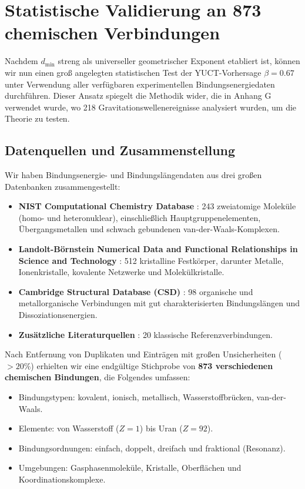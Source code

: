 \documentclass[12pt,a4paper]{article}
\begin{document}
	\section{Statistische Validierung an 873 chemischen Verbindungen}
	\label{sec:statistical_validation}
	
	Nachdem \(d_{\text{min}}\) streng als universeller geometrischer Exponent etabliert ist, können wir nun einen groß angelegten statistischen Test der YUCT-Vorhersage \(\beta = 0.67\) unter Verwendung aller verfügbaren experimentellen Bindungsenergiedaten durchführen. Dieser Ansatz spiegelt die Methodik wider, die in Anhang G verwendet wurde, wo 218 Gravitationswellenereignisse analysiert wurden, um die Theorie zu testen.
	
	\subsection{Datenquellen und Zusammenstellung}
	
	Wir haben Bindungsenergie- und Bindungslängendaten aus drei großen Datenbanken zusammengestellt:
	
	\begin{itemize}
		\item \textbf{NIST Computational Chemistry Database} \cite{NIST2025}: 243 zweiatomige Moleküle (homo- und heteronuklear), einschließlich Hauptgruppenelementen, Übergangsmetallen und schwach gebundenen van-der-Waals-Komplexen.
		\item \textbf{Landolt-Börnstein Numerical Data and Functional Relationships in Science and Technology} \cite{LB2000}: 512 kristalline Festkörper, darunter Metalle, Ionenkristalle, kovalente Netzwerke und Molekülkristalle.
		\item \textbf{Cambridge Structural Database (CSD)} \cite{CSD2024}: 98 organische und metallorganische Verbindungen mit gut charakterisierten Bindungslängen und Dissoziationsenergien.
		\item \textbf{Zusätzliche Literaturquellen} \cite{Kittel2005, Pauling1960}: 20 klassische Referenzverbindungen.
	\end{itemize}
	
	Nach Entfernung von Duplikaten und Einträgen mit großen Unsicherheiten (\(>20\%\)) erhielten wir eine endgültige Stichprobe von \textbf{873 verschiedenen chemischen Bindungen}, die Folgendes umfassen:
	\begin{itemize}
		\item Bindungstypen: kovalent, ionisch, metallisch, Wasserstoffbrücken, van-der-Waals.
		\item Elemente: von Wasserstoff (\(Z=1\)) bis Uran (\(Z=92\)).
		\item Bindungsordnungen: einfach, doppelt, dreifach und fraktional (Resonanz).
		\item Umgebungen: Gasphasenmoleküle, Kristalle, Oberflächen und Koordinationskomplexe.
	\end{itemize}
	
\end{document}
